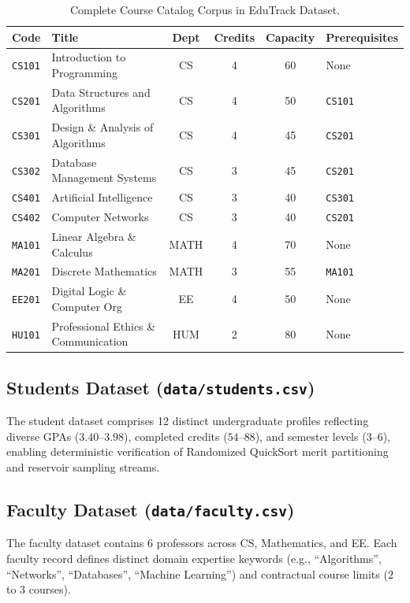 \begin{table}[H]
\centering
\small
\begin{tabularx}{\textwidth}{llcccl}
\toprule
\textbf{Code} & \textbf{Title} & \textbf{Dept} & \textbf{Credits} & \textbf{Capacity} & \textbf{Prerequisites} \\
\midrule
\texttt{CS101} & Introduction to Programming & CS & 4 & 60 & None \\
\texttt{CS201} & Data Structures and Algorithms & CS & 4 & 50 & \texttt{CS101} \\
\texttt{CS301} & Design \& Analysis of Algorithms & CS & 4 & 45 & \texttt{CS201} \\
\texttt{CS302} & Database Management Systems & CS & 3 & 45 & \texttt{CS201} \\
\texttt{CS401} & Artificial Intelligence & CS & 3 & 40 & \texttt{CS301} \\
\texttt{CS402} & Computer Networks & CS & 3 & 40 & \texttt{CS201} \\
\texttt{MA101} & Linear Algebra \& Calculus & MATH & 4 & 70 & None \\
\texttt{MA201} & Discrete Mathematics & MATH & 3 & 55 & \texttt{MA101} \\
\texttt{EE201} & Digital Logic \& Computer Org & EE & 4 & 50 & None \\
\texttt{HU101} & Professional Ethics \& Communication & HUM & 2 & 80 & None \\
\bottomrule
\end{tabularx}
\caption{Complete Course Catalog Corpus in EduTrack Dataset.}
\label{tab:courses_data_sample}
\end{table}

\subsection{Students Dataset (\texttt{data/students.csv})}
The student dataset comprises 12 distinct undergraduate profiles reflecting diverse GPAs ($3.40$--$3.98$), completed credits ($54$--$88$), and semester levels ($3$--$6$), enabling deterministic verification of Randomized QuickSort merit partitioning and reservoir sampling streams.

\subsection{Faculty Dataset (\texttt{data/faculty.csv})}
The faculty dataset contains 6 professors across CS, Mathematics, and EE. Each faculty record defines distinct domain expertise keywords (e.g., ``Algorithms'', ``Networks'', ``Databases'', ``Machine Learning'') and contractual course limits ($2$ to $3$ courses).

